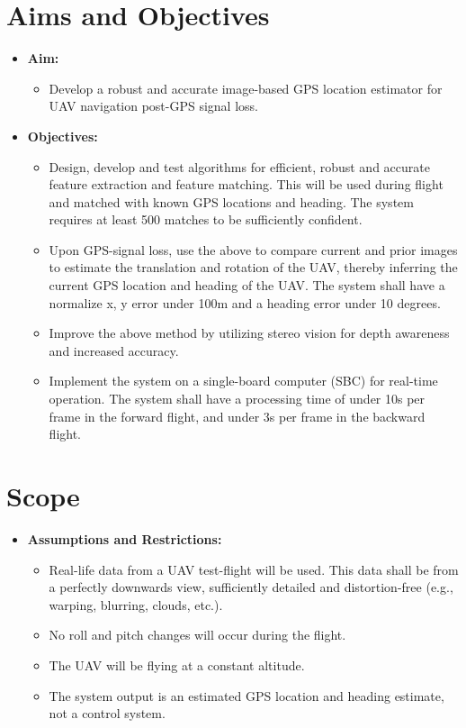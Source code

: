 \section{Aims and Objectives}
\begin{itemize}
    \item \textbf{Aim:}
    \begin{itemize}
        \item Develop a robust and accurate image-based GPS location estimator for UAV navigation post-GPS signal loss. 
    \end{itemize}
    \item \textbf{Objectives:}
    \begin{itemize}
        \item Design, develop and test algorithms for efficient, robust and accurate feature extraction and feature matching. This will be used during flight and matched with known GPS locations and heading. The system requires at least 500 matches to be sufficiently confident. 
        \item Upon GPS-signal loss, use the above to compare current and prior images to estimate the translation and rotation of the UAV, thereby inferring the current GPS location and heading of the UAV. The system shall have a normalize x, y error under 100m and a heading error under 10 degrees.
        \item Improve the above method by utilizing stereo vision for depth awareness and increased accuracy. 
        \item Implement the system on a single-board computer (SBC) for real-time operation. The system shall have a processing time of under 10s per frame in the forward flight, and under 3s per frame in the backward flight.
    \end{itemize}
\end{itemize}

\section{Scope}
\begin{itemize}
    \item \textbf{Assumptions and Restrictions:}
    \begin{itemize}
        \item Real-life data from a UAV test-flight will be used. This data shall be from a perfectly downwards view, sufficiently detailed and distortion-free (e.g., warping, blurring, clouds, etc.).
        \item No roll and pitch changes will occur during the flight.
        \item The UAV will be flying at a constant altitude.
        \item The system output is an estimated GPS location and heading estimate, not a control system.
    \end{itemize}
\end{itemize}

